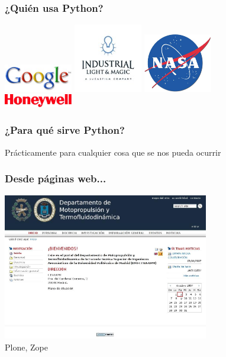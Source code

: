 \documentclass{beamer}
\begin{document}
\begin{frame}
  \frametitle{¿Quién usa Python?}

  \begin{center}
    \includegraphics[width=3cm]{files/google.jpg}
    \includegraphics[width=3cm]{files/Industrial_Light_and_Magic.jpg}
    \includegraphics[width=3cm]{files/NASA_Logo.jpg}\\
    \includegraphics[width=3cm]{files/honeywell_logo.jpg}
  \end{center}
\end{frame}

\begin{frame}
  \frametitle{¿Para qué sirve Python?}
  \begin{center}
    Prácticamente para cualquier cosa que se nos pueda ocurrir
  \end{center}

\end{frame}

\begin{frame}
  \frametitle{Desde páginas web...}
  \begin{center}
    \includegraphics[width=9cm]{files/snapshot1.jpg}\\
    Plone, Zope
  \end{center}

\end{frame}
\end{document}
